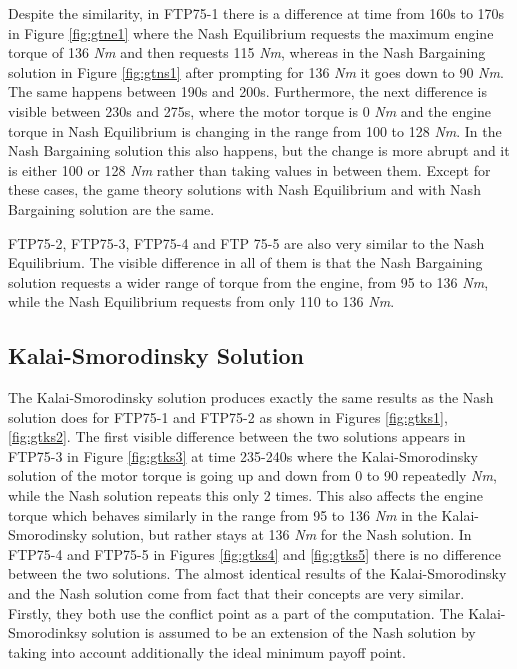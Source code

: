 Despite the similarity, in FTP75-1 there is a difference at time from 160s to 170s in Figure \ref{fig:gtne1} where the Nash Equilibrium requests the maximum engine torque of 136 \textit{Nm} and then requests 115 \textit{Nm}, whereas in the Nash Bargaining solution in Figure \ref{fig:gtns1} after prompting for 136 \textit{Nm} it goes down to 90 \textit{Nm}. The same happens between 190s and 200s. Furthermore, the next difference is visible between 230s and 275s, where the motor torque is 0 \textit{Nm} and the engine torque in Nash Equilibrium is changing in the range from 100 to 128 \textit{Nm}. In the Nash Bargaining solution this also happens, but the change is more abrupt and it is either 100 or 128 \textit{Nm} rather than taking values in between them. Except for these cases, the game theory solutions with Nash Equilibrium and with Nash Bargaining solution are the same.

FTP75-2, FTP75-3, FTP75-4 and FTP 75-5 are also very similar to the Nash Equilibrium. The visible difference in all of them is that the Nash Bargaining solution requests a wider range of torque from the engine, from 95 to 136 \textit{Nm}, while the Nash Equilibrium requests from only 110 to 136 \textit{Nm}.

\subsection{Kalai-Smorodinsky Solution}
The Kalai-Smorodinsky solution produces exactly the same results as the Nash solution does for FTP75-1 and FTP75-2 as shown in Figures \ref{fig:gtks1}, \ref{fig:gtks2}. The first visible difference between the two solutions appears in FTP75-3 in Figure \ref{fig:gtks3} at time 235-240s where the Kalai-Smorodinsky solution of the motor torque is going up and down from 0 to 90 repeatedly \textit{Nm}, while the Nash solution repeats this only 2 times. This also affects the engine torque which behaves similarly in the range from 95 to 136 \textit{Nm} in the Kalai-Smorodinsky solution, but rather stays at 136 \textit{Nm} for the Nash solution. In FTP75-4 and FTP75-5 in Figures \ref{fig:gtks4} and \ref{fig:gtks5} there is no difference between the two solutions. The almost identical results of the Kalai-Smorodinsky and the Nash solution come from fact that their concepts are very similar. Firstly, they both use the conflict point as a part of the computation. The Kalai-Smorodinksy solution is assumed to be an extension of the Nash solution by taking into account additionally the ideal minimum payoff point.

